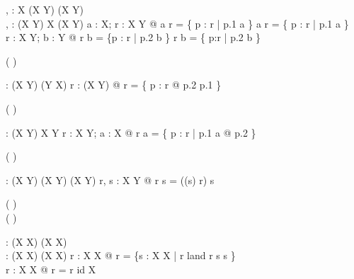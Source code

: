 \begin{gendef}[X, Y]
  \varg \dres \varg , \varg \ndres \varg : \power X \cross (X \rel Y) \fun (X \rel Y)\\
  \varg \rres \varg , \varg \nrres \varg : (X \rel Y) \cross \power X \fun (X \rel Y)
\where
  \forall a : \power X; r : X \rel Y @ a \dres r = 
      \{ p : r | p.1 \in a \} \land a \ndres r = \{ p : r | p.1 \notin a \}\\
  \forall r : X \rel Y; b : \power Y @ r \rres b = \{p : r | p.2 \in b \} \land
      r \nrres b = \{ p:r | p.2 \notin b \}
\end{gendef}

\begin{zed}
   ( \varg \inv )
\end{zed}

\begin{gendef}[X, Y]
  \varg \inv : (X \rel Y) \fun (Y \rel X)
\where
  \forall r : (X \rel Y) @ r \inv = \{ p : r @ p.2 \mapsto p.1 \}
\end{gendef}

\begin{zed}
   ( \varg \limg \varg \rimg )
\end{zed}

\begin{gendef}[X, Y]
  \varg \limg \varg \rimg : (X \rel Y) \cross \power X \fun \power Y
\where
  \forall r : X \rel Y; a : \power X @ r \limg a \rimg = 
      \{ p : r | p.1 \in a @ p.2 \}
\end{gendef}

\begin{zed}
   \leftassoc ( \varg \oplus \varg )
\end{zed}

\begin{gendef}[X, Y]
  \varg \oplus \varg : (X \rel Y) \cross (X \rel Y) \fun (X \rel Y)
\where
  \forall r, s : X \rel Y @ r \oplus s = ((\dom s) \ndres r) \cup s
\end{gendef}

\begin{zed}
   ( \varg \plus )\\
   ( \varg \star )
\end{zed}

\begin{gendef}[X]
  \varg \plus : (X \rel X) \fun (X \rel X)\\
  \varg \star : (X \rel X) \fun (X \rel X)
\where
  \forall r : X \rel X @ r \plus = \bigcap \{s : X \rel X | r
  \subseteq land r \comp s \subseteq s \}\\
  \forall r : X \rel X @ r \star = r \plus \cup id X
\end{gendef}
